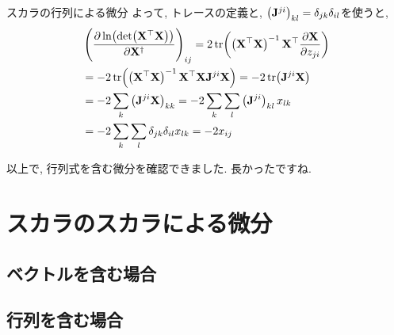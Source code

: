 \documentclass[dvipdfmx,notheorems,t]{beamer}
\begin{document}
\begin{frame}{スカラの行列による微分}
よって, トレースの定義と, $\left( \vb{J}^{ji} \right)_{kl} = \delta_{jk} \delta_{il}$を使うと,
\begin{align*}
  & \left( \pdv{\ln(\det(\vb{X}^\top \vb{X}))}{\vb{X}^\dagger} \right)_{ij}
    = 2 \tr(\left( \vb{X}^\top \vb{X} \right)^{-1} \vb{X}^\top \pdv{\vb{X}}{z_{ji}}) \\
    &= -2 \tr(\left( \vb{X}^\top \vb{X} \right)^{-1} \vb{X}^\top \vb{X} \vb{J}^{ji} \vb{X})
    = -2 \tr(\vb{J}^{ji} \vb{X}) \\
    &= -2 \sum_k \left( \vb{J}^{ji} \vb{X} \right)_{kk}
    = -2 \sum_k \sum_l \left( \vb{J}^{ji} \right)_{kl} x_{lk} \\
    &= -2 \sum_k \sum_l \delta_{jk} \delta_{il} x_{lk}
    = -2 x_{ij}
\end{align*}

以上で, 行列式を含む微分を確認できました. 長かったですね.
\end{frame}

\section{スカラのスカラによる微分}
\subsection{ベクトルを含む場合}

\subsection{行列を含む場合}
\end{document}
